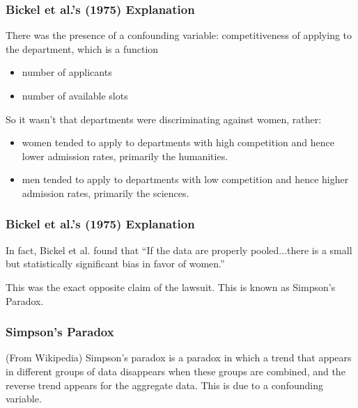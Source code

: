 \documentclass[handout]{beamer}
\newcommand{\blue}[1]{\textcolor{blue2}{#1}}
\begin{document}
\begin{frame}
\frametitle{Bickel et al.'s (1975) Explanation}

There was the presence of a confounding variable: \blue{competitiveness} of applying to the department, which is a function
\begin{itemize}
\item number of applicants
\item number of available slots
\end{itemize}

\vskip 0.5cm

\pause So it wasn't that departments were discriminating against women, rather:
\begin{itemize}
\pause \item women tended to apply to departments with high competition and hence lower admission rates, primarily the humanities.
\pause \item men tended to apply to departments with low competition and hence higher admission rates, primarily the sciences.
\end{itemize}

\end{frame}


\begin{frame}
\frametitle{Bickel et al.'s (1975) Explanation}

In fact, Bickel et al. found that ``If the data are properly \blue{pooled}...there is a small but statistically significant bias in \blue{favor of women}.''

\vskip 0.5cm

\pause This was the exact \blue{opposite} claim of the lawsuit.  This is known as \blue{Simpson's Paradox}.  

\end{frame}



\begin{frame}
\frametitle{Simpson's Paradox}

(From Wikipedia) Simpson's paradox is a paradox in which a trend that appears in different groups of data disappears when these groups are combined, and the \blue{reverse trend} appears for the aggregate data.  This is due to a confounding variable.

\end{frame}
\end{document}
